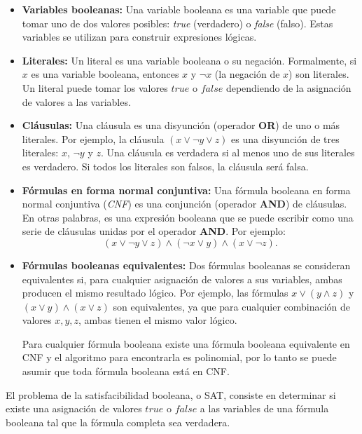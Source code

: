 \begin{itemize}
  \item \textbf{Variables booleanas:}
        Una variable booleana es una variable que puede tomar uno de dos valores posibles: \textit{true} (verdadero) o \textit{false} (falso). Estas variables se utilizan para construir expresiones lógicas.
  \item \textbf{Literales:}
        Un literal es una variable booleana o su negación. Formalmente, si \( x \) es una variable booleana, entonces \( x \) y \( \neg x \) (la negación de \( x \)) son literales. Un literal puede tomar los valores \( true \) o \( false \) dependiendo de la asignación de valores a las variables.
  \item  \textbf{Cláusulas:}
        Una cláusula es una disyunción (operador \textbf{OR}) de uno o más literales. Por ejemplo, la cláusula \( (x \vee \neg y \vee z) \) es una disyunción de tres literales: \( x \), \( \neg y \) y \( z \). Una cláusula es verdadera si al menos uno de sus literales es verdadero. Si todos los literales son falsos, la cláusula será falsa.
  \item \textbf{Fórmulas en forma normal conjuntiva:}
        Una fórmula booleana en forma normal conjuntiva (\textit{CNF}) es una conjunción (operador \textbf{AND}) de cláusulas. En otras palabras, es una expresión booleana que se puede escribir como una serie de cláusulas unidas por el operador \textbf{AND}. Por ejemplo:        
        \[
          (x \vee \neg y \vee z) \wedge (\neg x \vee y) \wedge (x \vee \neg z).
        \]
  \item \textbf{Fórmulas booleanas equivalentes:}
        Dos fórmulas booleanas se consideran equivalentes si, para cualquier asignación de valores a sus variables, ambas producen el mismo resultado lógico. Por ejemplo, las fórmulas \( x \vee (y \wedge z) \) y \( (x \vee y) \wedge (x \vee z) \) son equivalentes, ya que para cualquier combinación de valores \( x, y, z \), ambas tienen el mismo valor lógico.
        
        Para cualquier fórmula booleana existe una fórmula booleana equivalente en CNF \cite{authomataTheory} y 
        el algoritmo para encontrarla es polinomial, por lo tanto se puede asumir que toda fórmula booleana está en CNF.
        
\end{itemize}

El problema de la satisfacibilidad booleana, o SAT, consiste en determinar si existe una asignación de valores \( true \) o \( false \) a las variables de una fórmula booleana tal que la fórmula completa sea verdadera. 

